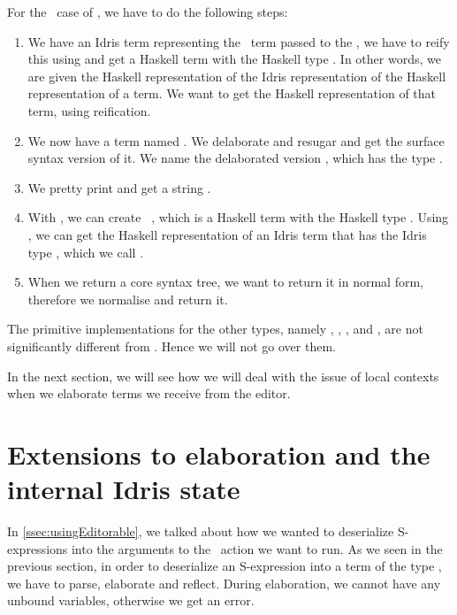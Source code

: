 For the \TT\ case of , we have to do the following steps:
\begin{enumerate}
  \item We have an Idris term  representing the \TT\ term passed to
    the , we have to reify this using  and
    get a Haskell term with the Haskell type .
    In other words, we are given the Haskell representation of the Idris
    representation of the Haskell representation of a term.
    We want to get the Haskell representation of that term, using reification.
  \item We now have a  term named . We delaborate and resugar
     and get the surface syntax version of it. We name the delaborated
    version , which has the type .
  \item We pretty print  and get a string .
  \item With , we can create \texttt{ }, which is a
    Haskell term with the Haskell type . Using , we
    can get the Haskell representation of an Idris term that has the Idris type
    , which we call .
  \item When we return a core syntax tree, we want to return it in normal form,
    therefore we normalise  and return it.
\end{enumerate}

The primitive implementations for the other types, namely ,
, , and , are not significantly
different from . Hence we will not go over them.

In the next section, we will see how we will deal with the issue of local
contexts when we elaborate terms we receive from the editor.

\section{Extensions to elaboration and the internal Idris state}
\label{sec:extendIState}

In \autoref{ssec:usingEditorable}, we talked about how we wanted to deserialize
S-expressions into the arguments to the \Elab\ action we want to run.
As we seen in the previous section, in order to deserialize an S-expression
into a term of the type \TT, we have to parse, elaborate and reflect.
During elaboration, we cannot have any unbound variables, otherwise we get an
error.

